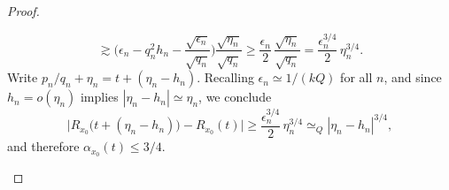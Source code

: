 \documentclass[11pt,reqno]{amsart}
\theoremstyle{definition}
\begin{document}
\begin{proof}
\begin{itemize}
\begin{itemize}
\begin{equation}
	\gtrsim \Big( \epsilon_n - q_n^2 h_n - \frac{\sqrt{\epsilon_n}}{ \sqrt{q_n} } \Big) \frac{\sqrt{\eta_n}}{\sqrt{q_n}}
	\geq \frac{\epsilon_n}{2} \, \frac{\sqrt{\eta_n}}{\sqrt{q_n}}
	=  \frac{\epsilon_n^{3/4}}{2} \, \eta_n^{3/4}.
	\end{equation}
	Write $p_n/q_n + \eta_n = t + (\eta_n - h_n)$. 
	Recalling $\epsilon_n \simeq 1/(kQ)$ for all $n$, and since $h_n = o(\eta_n)$ implies $|\eta_n - h_n| \simeq \eta_n$,  we conclude
	\begin{equation}
	\Big|  R_{x_0}\Big( t + (\eta_n - h_n) \Big) -R_{x_0}(t) \Big|
	\geq  \frac{\epsilon_n^{3/4}}{2} \, \eta_n^{3/4}
	\simeq_Q |\eta_n - h_n|^{3/4}, 
	\end{equation}
	and therefore $\alpha_{x_0}(t) \leq 3/4$. 
\end{itemize}

\end{itemize}
\end{proof}
\end{document}
